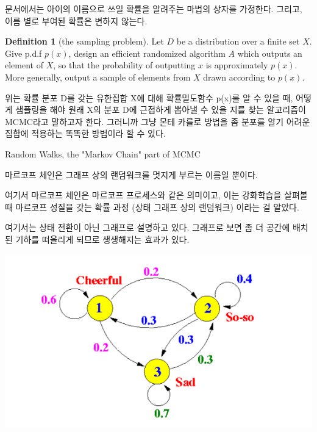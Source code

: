 \documentclass[ %
    a4paper,    %
    amsmath,    %
    itemph,     %
]{oblivoir}     %
\theoremstyle{theorem}
\theoremstyle{theorem}
\theoremstyle{theorem}
\theoremstyle{definition}
\newtheorem{definition}{Definition}[theorem]
\theoremstyle{remark}
\begin{document}
문서에서는 아이의 이름으로 쓰일 확률을 알려주는 마법의 상자를 가정한다. 
그리고, 이름 별로 부여된 확률은 변하지 않는다. 

\begin{definition}[the sampling problem]
Let $D$ be a distribution over a finite set $X$. Give p.d.f $p(x)$, 
design an efficient randomized algorithm $A$ which outputs an element of $X$, 
so that the probability of outputting $x$ is approximately $p(x)$. 
More generally, output a sample of elements from $X$ drawn according 
to $p(x)$.

\end{definition}

위는 확률 분포 D를 갖는 유한집합 X에 대해 확률밀도함수 p(x)를 알 수 있을 때, 
어떻게 샘플링을 해야 원래 X의 분포 D에 근접하게 뽑아낼 수 있을 지를 찾는 
알고리즘이 MCMC라고 말하고자 한다. 그러니까 그냥 몬테 카를로 방법을 
좀 분포를 알기 어려운 집합에 적용하는 똑똑한 방법이라 할 수 있다. 

\begin{tcolorbox}
Random Walks, the "Markov Chain" part of MCMC
\end{tcolorbox}

마르코프 체인은 그래프 상의 랜덤워크를 멋지게 부르는 이름일 뿐이다. 

여기서 마르코프 체인은 마르코프 프로세스와 같은 의미이고, 이는 
강화학습을 살펴볼 때 마르코프 성질을 갖는 확률 과정 (상태 그래프 상의 랜덤워크) 
이라는 걸 알았다. 

여기서는 상태 전환이 아닌 그래프로 설명하고 있다. 그래프로 보면 
좀 더 공간에 배치된 기하를 떠올리게 되므로 생생해지는 효과가 있다. 

\begin{center}
\includegraphics[scale=0.5]{3_markov_chain}
\end{center}
\end{document}
